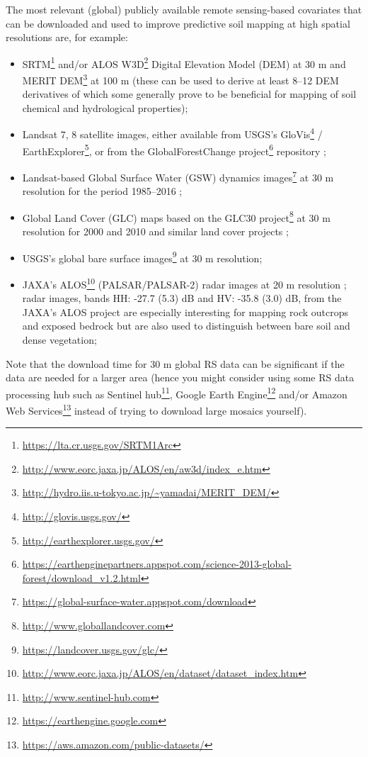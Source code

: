\documentclass[graybox,natbib,nospthms,UStrade]{svmono}
\renewcommand{\href}[2]{#2 (\url{#1})}
\renewcommand{\href}[2]{#2\footnote{\url{#1}}}
\begin{document}
The most relevant (global) publicly available remote sensing-based covariates that can be downloaded and used to improve predictive soil mapping at high spatial resolutions are, for example:

\begin{itemize}
\item
  \href{https://lta.cr.usgs.gov/SRTM1Arc}{SRTM} and/or \href{http://www.eorc.jaxa.jp/ALOS/en/aw3d/index_e.htm}{ALOS W3D} Digital Elevation Model (DEM) at 30 m and \href{http://hydro.iis.u-tokyo.ac.jp/~yamadai/MERIT_DEM/}{MERIT DEM} at 100 m (these can be used to derive at least 8--12 DEM derivatives of which some generally prove to be beneficial for mapping of soil chemical and hydrological properties);
\item
  Landsat 7, 8 satellite images, either available from USGS's \href{http://glovis.usgs.gov/}{GloVis} / \href{http://earthexplorer.usgs.gov/}{EarthExplorer}, or from the \href{https://earthenginepartners.appspot.com/science-2013-global-forest/download_v1.2.html}{GlobalForestChange project} repository \citep{hansen2013high};
\item
  \href{https://global-surface-water.appspot.com/download}{Landsat-based Global Surface Water (GSW) dynamics images} at 30 m resolution for the period 1985--2016 \citep{pekel2016high};
\item
  Global Land Cover (GLC) maps based on the \href{http://www.globallandcover.com}{GLC30 project} at 30 m resolution for 2000 and 2010 \citep{Chen2014} and similar land cover projects \citep{Herold2016};
\item
  USGS's \href{https://landcover.usgs.gov/glc/}{global bare surface images} at 30 m resolution;
\item
  \href{http://www.eorc.jaxa.jp/ALOS/en/dataset/dataset_index.htm}{JAXA's ALOS} (PALSAR/PALSAR-2) radar images at 20 m resolution \citep{shimada2014new}; radar images, bands HH: -27.7 (5.3) dB and HV: -35.8 (3.0) dB, from the JAXA's ALOS project are especially interesting for mapping rock outcrops and exposed bedrock but are also used to distinguish between bare soil and dense vegetation;
\end{itemize}

Note that the download time for 30 m global RS data can be significant if the data are needed for a larger area (hence you might consider using some RS data processing hub such as \href{http://www.sentinel-hub.com}{Sentinel hub}, \href{https://earthengine.google.com}{Google Earth Engine} and/or \href{https://aws.amazon.com/public-datasets/}{Amazon Web Services} instead of trying to download large mosaics yourself).
\end{document}
